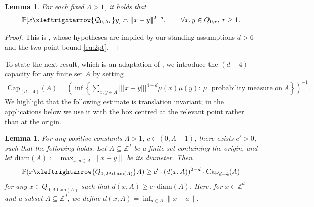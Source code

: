 \documentclass[11pt]{article}
\theoremstyle{definition}
\theoremstyle{remark}
\newcommand{\Z}{\mathbb{Z}}
\newcommand{\bP}{\mathbb{P}}
\numberwithin{equation}{section}
\theoremstyle{plain}
\newtheorem{lem}[theorem]{Lemma}
\theoremstyle{definition}
\theoremstyle{remark}
\theoremstyle{plain}
\newcommand{\tnorm}[1]{\vert\!\vert\!\vert #1 \vert\!\vert\!\vert}
\begin{document}
\begin{lem}\label{restricted2pt}
    For each fixed $\Lambda>1$,  it holds that
\[\bP[x \xleftrightarrow{\mathcal{Q}_{0,\Lambda r}} y ] \asymp \tnorm{x-y}^{2-d},\qquad \forall x,y\in Q_{0,r},\:r\geq 1.
\]
\end{lem}
\begin{proof} This is \cite[Theorem~1.3]{CH}, whose hypotheses are implied by our standing assumptions $d>6$ and the two-point bound \eqref{eq:2pt}.
\end{proof}

To state the next result, which is an adaptation of \cite[Lemma 6.3]{ASS}, we introduce the $(d-4)$-capacity for any finite set $A$ by setting
\begin{align*}
    \mathrm{Cap}_{(d-4)}(A)=\left(\inf \left\{\sum_{x,y\in A} \tnorm{x-y}^{4-d}\mu(x)\mu(y): \:\mu~\text{ probability measure on}~A\right\}\right)^{-1}.
\end{align*}
We highlight that the following estimate is translation invariant; in the applications below we use it with the box centred at the relevant point rather than at the origin.

\begin{lem}\label{capacity}
For any positive constants $\Lambda>1$, $c\in (0,\Lambda-1)$, there exists $c' > 0$, such that the following holds. Let $A \subseteq \Z^d$ be a finite set containing the origin, and let $\mathrm{diam}(A):=\max_{x,y \in A} \|x-y\|$ be its diameter. Then
\[\bP(x \xleftrightarrow{ Q_{0,2\Lambda\text{diam}(A)}} A) \geq c' \cdot (d(x,A))^{2-d} \cdot \mathrm{Cap}_{d-4}(A)\]
for any $x\in Q_{0,\Lambda \mathrm{diam}(A)}$ such that $d(x, A) \geq c \cdot \mathrm{diam}(A)$. Here, for $x \in \Z^d$ and a subset $A \subseteq \Z^d$, we define $d(x,A)=\inf_{a \in A}\|x-a\|$.
\end{lem}
\end{document}

